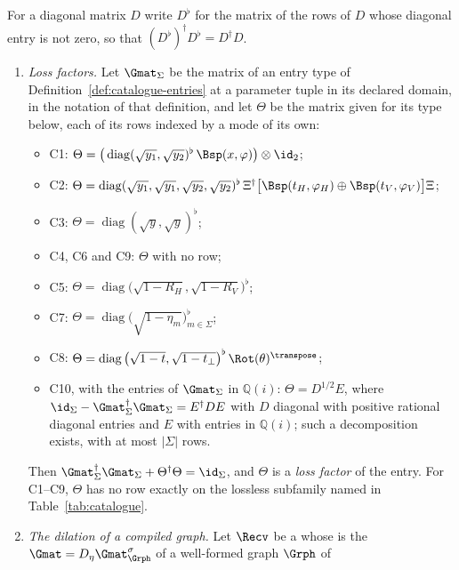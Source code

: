 \begin{lemma}\label{lem:catalogue-dilations}
For a diagonal matrix $D$ write $D^{\flat}$ for the matrix of the rows of $D$
whose diagonal entry is not zero, so that
$(D^{\flat})^{\dagger}D^{\flat}=D^{\dagger}D$.
\begin{enumerate}[label=(\roman*),leftmargin=2.2em]
\item \emph{Loss factors.} Let $\Gmat_\Sigma$ be the matrix of an entry type
  of Definition~\ref{def:catalogue-entries} at a parameter tuple in its
  declared domain, in the notation of that definition, and let $\Theta$ be
  the matrix given for its type below, each of its rows indexed by a mode of
  its own:
  \begin{itemize}
  \item C1: $\Theta=\big(\operatorname{diag}(\sqrt{y_1},\sqrt{y_2})^{\flat}\,\Bsp(x,\varphi)\big)\otimes\id_2$;
  \item C2: $\Theta=\operatorname{diag}(\sqrt{y_1},\sqrt{y_1},\sqrt{y_2},\sqrt{y_2})^{\flat}\,
    \Xi^{\dagger}\big[\Bsp(t_H,\varphi_H)\oplus\Bsp(t_V,\varphi_V)\big]\Xi$;
  \item C3: $\Theta=\operatorname{diag}(\sqrt{y},\sqrt{y})^{\flat}$;
  \item C4, C6 and C9: $\Theta$ with no row;
  \item C5: $\Theta=\operatorname{diag}\big(\sqrt{1-R_H},\sqrt{1-R_V}\big)^{\flat}$;
  \item C7: $\Theta=\operatorname{diag}\big(\sqrt{1-\eta_m}\big)_{m\in\Sigma}^{\flat}$;
  \item C8: $\Theta=\operatorname{diag}\big(\sqrt{1-t},\sqrt{1-t_\perp}\big)^{\flat}\,\Rot(\theta)^{\transpose}$;
  \item C10, with the entries of $\Gmat_\Sigma$ in $\mathbb{Q}(i)$:
    $\Theta=D^{1/2}E$, where
    $\id_\Sigma-\Gmat_\Sigma^{\dagger}\Gmat_\Sigma=E^{\dagger}DE$ with $D$
    diagonal with positive rational diagonal entries and $E$ with entries in
    $\mathbb{Q}(i)$; such a decomposition exists, with at most $|\Sigma|$
    rows.
  \end{itemize}
  Then $\Gmat_\Sigma^{\dagger}\Gmat_\Sigma+\Theta^{\dagger}\Theta=\id_\Sigma$,
  and $\Theta$ is a \emph{loss factor} of the entry. For C1--C9, $\Theta$ has
  no row exactly on the lossless subfamily named in
  Table~\ref{tab:catalogue}.
\item \emph{The dilation of a compiled graph.} Let $\Recv$ be a
   whose  is the
  $\Gmat=D_\eta\Gmat^{\sigma}_{\Grph}$ of a well-formed graph $\Grph$ of

\end{enumerate}
\end{lemma}
